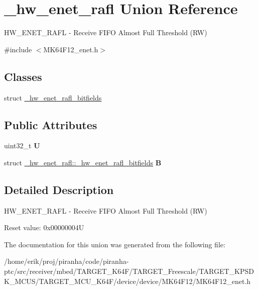 \hypertarget{union__hw__enet__rafl}{}\section{\+\_\+hw\+\_\+enet\+\_\+rafl Union Reference}
\label{union__hw__enet__rafl}


H\+W\+\_\+\+E\+N\+E\+T\+\_\+\+R\+A\+FL -\/ Receive F\+I\+FO Almost Full Threshold (RW)  




{\ttfamily \#include $<$M\+K64\+F12\+\_\+enet.\+h$>$}

\subsection*{Classes}
\begin{DoxyCompactItemize}
\item 
struct \hyperlink{struct__hw__enet__rafl_1_1__hw__enet__rafl__bitfields}{\+\_\+hw\+\_\+enet\+\_\+rafl\+\_\+bitfields}
\end{DoxyCompactItemize}
\subsection*{Public Attributes}
\begin{DoxyCompactItemize}
\item 
uint32\+\_\+t {\bfseries U}\hypertarget{union__hw__enet__rafl_a051ac2c8e99f9b4b13c650aea0c368aa}{}\label{union__hw__enet__rafl_a051ac2c8e99f9b4b13c650aea0c368aa}

\item 
struct \hyperlink{struct__hw__enet__rafl_1_1__hw__enet__rafl__bitfields}{\+\_\+hw\+\_\+enet\+\_\+rafl\+::\+\_\+hw\+\_\+enet\+\_\+rafl\+\_\+bitfields} {\bfseries B}\hypertarget{union__hw__enet__rafl_a2eb28f3f3dbb63cca4a9eec4561400a8}{}\label{union__hw__enet__rafl_a2eb28f3f3dbb63cca4a9eec4561400a8}

\end{DoxyCompactItemize}


\subsection{Detailed Description}
H\+W\+\_\+\+E\+N\+E\+T\+\_\+\+R\+A\+FL -\/ Receive F\+I\+FO Almost Full Threshold (RW) 

Reset value\+: 0x00000004U 

The documentation for this union was generated from the following file\+:\begin{DoxyCompactItemize}
\item 
/home/erik/proj/piranha/code/piranha-\/ptc/src/receiver/mbed/\+T\+A\+R\+G\+E\+T\+\_\+\+K64\+F/\+T\+A\+R\+G\+E\+T\+\_\+\+Freescale/\+T\+A\+R\+G\+E\+T\+\_\+\+K\+P\+S\+D\+K\+\_\+\+M\+C\+U\+S/\+T\+A\+R\+G\+E\+T\+\_\+\+M\+C\+U\+\_\+\+K64\+F/device/device/\+M\+K64\+F12/M\+K64\+F12\+\_\+enet.\+h\end{DoxyCompactItemize}
